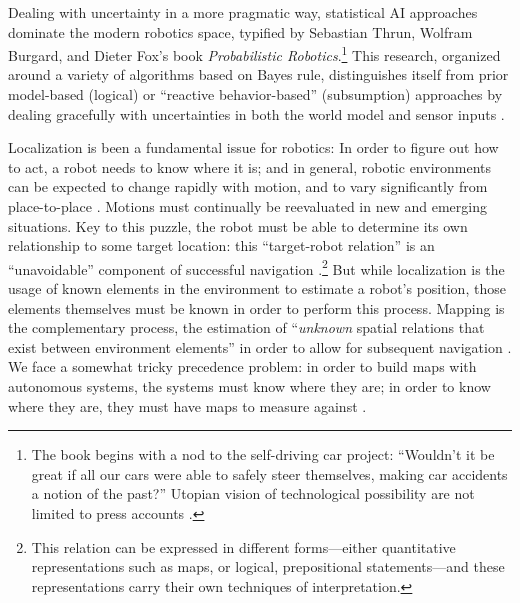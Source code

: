 
Dealing with uncertainty in a more pragmatic way, statistical AI
approaches dominate the modern robotics space, typified by Sebastian 
Thrun, Wolfram Burgard, and Dieter Fox's book
\emph{Probabilistic Robotics}.\footnote{The book begins with a nod to
  the self-driving car project: ``Wouldn't it be great if all our cars
were able to safely steer themselves, making car accidents a notion of
the past?'' Utopian vision of technological possibility are not
limited to press accounts \cite[p. 3]{thrunProb}.} This research,
organized around a variety of algorithms based on Bayes rule,
distinguishes itself from prior model-based (logical) or ``reactive
behavior-based'' (subsumption) approaches by dealing gracefully with
uncertainties in both the world model and sensor inputs \cite[p.
  9]{thrunProb}. 


Localization is been a fundamental issue for robotics: In order to figure out how to act, a robot
needs to know where it is; and in general, robotic environments can be
expected to change rapidly with motion, and to vary significantly from
place-to-place \cite[p. 4]{SLAMbook}. Motions must continually be reevaluated in new and
emerging situations. Key to this puzzle, the robot must be able to determine its own
relationship to some target location: this
``target-robot relation'' is an ``unavoidable'' component of successful
navigation \cite[p. 5]{SLAMbook}.\footnote{This relation can be expressed
in different forms---either quantitative representations such as maps,
or logical, prepositional statements---and these representations carry
their own techniques of interpretation.} But while
localization is the usage of known elements in the environment to
estimate a robot's position, those elements themselves must be known
in order to perform this process. Mapping is the complementary
process, the estimation of ``\emph{unknown} spatial relations that
exist between environment elements'' in order to allow for subsequent
navigation \cite[p. 5]{SLAMbook}. We face a somewhat tricky
precedence problem:  in order to build maps with
autonomous systems, the systems must know where they are; in order to know
where they are, they must have maps to measure
against \cite[p. 6]{SLAMbook}.

